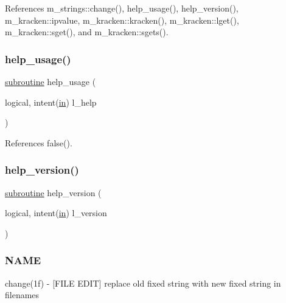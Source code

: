 References m\+\_\+strings\+::change(), help\+\_\+usage(), help\+\_\+version(), m\+\_\+kracken\+::ipvalue, m\+\_\+kracken\+::kracken(), m\+\_\+kracken\+::lget(), m\+\_\+kracken\+::sget(), and m\+\_\+kracken\+::sgets().

\mbox{\label{change_8f90_a3e09a3b52ee8fb04eeb93fe5761626a8}} 
\subsubsection{\texorpdfstring{help\+\_\+usage()}{help\_usage()}}
{\footnotesize\ttfamily \hyperlink{M__stopwatch_83_8txt_acfbcff50169d691ff02d4a123ed70482}{subroutine} help\+\_\+usage (\begin{DoxyParamCaption}\item[{logical, intent(\hyperlink{M__journal_83_8txt_afce72651d1eed785a2132bee863b2f38}{in})}]{l\+\_\+help }\end{DoxyParamCaption})}



References false().

\mbox{\label{change_8f90_a39c21619b08a3c22f19e2306efd7f766}} 
\subsubsection{\texorpdfstring{help\+\_\+version()}{help\_version()}}
{\footnotesize\ttfamily \hyperlink{M__stopwatch_83_8txt_acfbcff50169d691ff02d4a123ed70482}{subroutine} help\+\_\+version (\begin{DoxyParamCaption}\item[{logical, intent(\hyperlink{M__journal_83_8txt_afce72651d1eed785a2132bee863b2f38}{in})}]{l\+\_\+version }\end{DoxyParamCaption})}



\subsubsection*{N\+A\+ME}

change(1f) -\/ \mbox{[}F\+I\+LE E\+D\+IT\mbox{]} replace old fixed string with new fixed string in filenames 


